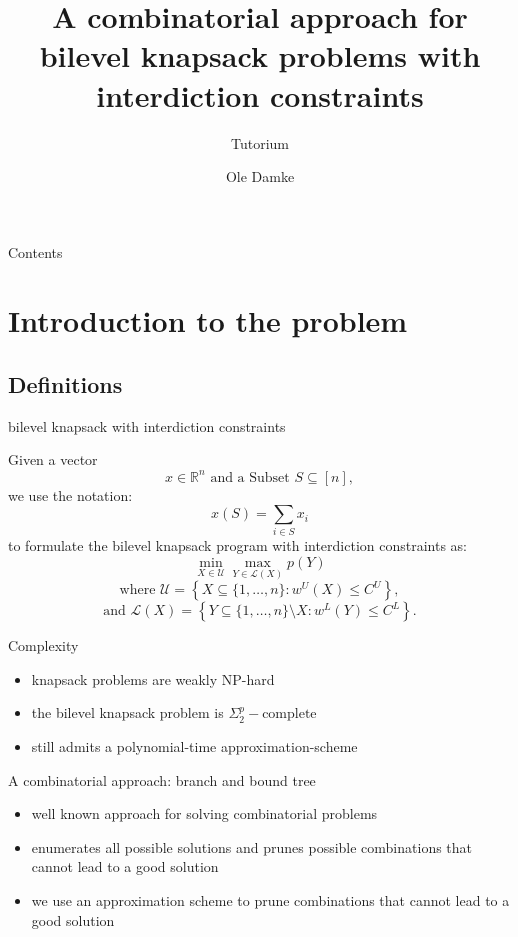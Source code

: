 \documentclass[fleqn,11pt,aspectratio=43]{beamer}
\title{A combinatorial approach for bilevel knapsack problems with interdiction constraints}
\subtitle{Tutorium}
\author{Ole Damke}
\begin{document}
\begin{frame}[plain]
\titlepage
\end{frame}




\begin{frame}{Contents}
    \tableofcontents
\end{frame}




\section{Introduction to the problem}

\subsection{Definitions}



\begin{frame}{bilevel knapsack with interdiction constraints}

Given a vector \[ x \in \mathbb{R}^n \text{ and a Subset }S \subseteq [n],\] we use the notation: \[ x(S) = \sum_{i \in S} x_i\]
to formulate the bilevel knapsack program with interdiction constraints as: \[ \min_{X \in \mathcal{U}} \max_{Y \in \mathcal{L}(X)} p(Y) \]
\[
\text{where } \mathcal{U} = \left\{ X \subseteq \{1, \dots, n\} : w^U(X) \leq C^U \right\},
\]
\[
\text{and } \mathcal{L}(X) = \left\{ Y \subseteq \{1, \dots, n\} \setminus X : w^L(Y) \leq C^L \right\}.
\]

\end{frame}




\begin{frame}{Complexity}
    \begin{itemize}
        \item knapsack problems are weakly NP-hard

        \item the bilevel knapsack problem is $\Sigma_2^p-\text{complete}$

        \item still admits a polynomial-time approximation-scheme
    \end{itemize}
\end{frame}


\begin{frame}{A combinatorial approach: branch and bound tree}
    \begin{itemize}
        \item well known approach for solving combinatorial problems

        \item enumerates all possible solutions and prunes possible combinations that cannot lead to a good solution

        \item we use an approximation scheme to prune combinations that cannot lead to a good solution
    \end{itemize}


\end{frame}
\end{document}
